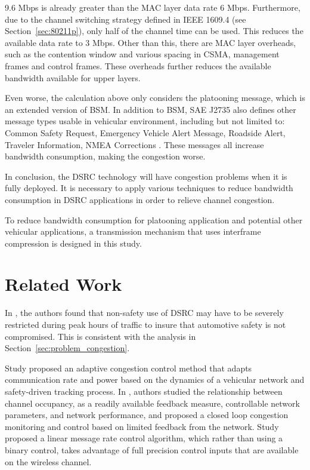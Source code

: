 \documentclass[12pt]{report}
\begin{document}
9.6 Mbps is already greater than the MAC layer data rate 6 Mbps. Furthermore, due to the channel switching strategy defined in IEEE 1609.4 (see Section~\ref{sec:80211p}), only half of the channel time can be used. This reduces the available data rate to 3 Mbps. Other than this, there are MAC layer overheads, such as the contention window and various spacing in CSMA, management frames and control frames. These overheads further reduces the available bandwidth available for upper layers.

Even worse, the calculation above only considers the platooning message, which is an extended version of BSM. In addition to BSM, SAE J2735 also defines other message types usable in vehicular environment, including but not limited to: Common Safety Request, Emergency Vehicle Alert Message, Roadside Alert, Traveler Information, NMEA Corrections \cite{sae2016j2735,kenney2011}. These messages all increase bandwidth consumption, making the congestion worse.

In conclusion, the DSRC technology will have congestion problems when it is fully deployed. It is necessary to apply various techniques to reduce bandwidth consumption in DSRC applications in order to relieve channel congestion.

To reduce bandwidth consumption for platooning application and potential other vehicular applications, a transmission mechanism that uses interframe compression is designed in this study.

\section{Related Work}

In \cite{Wang2008howmuch}, the authors found that non-safety use of DSRC may have to be severely restricted during peak hours of traffic to insure that automotive safety is not compromised. This is consistent with the analysis in Section~\ref{sec:problem_congestion}.

Study \cite{huang2010adaptive} proposed an adaptive congestion control method that adapts communication rate and power based on the dynamics of a vehicular network and safety-driven tracking process. In \cite{fallah2010occupancy}, authors studied the relationship between channel occupancy, as a readily available feedback measure, controllable network parameters, and network performance, and proposed a closed loop congestion monitoring and control based on limited feedback from the network. Study \cite{Kenney2011linear} proposed a linear message rate control algorithm, which rather than using a binary control, takes advantage of full precision control inputs that are available on the wireless channel.
\end{document}
